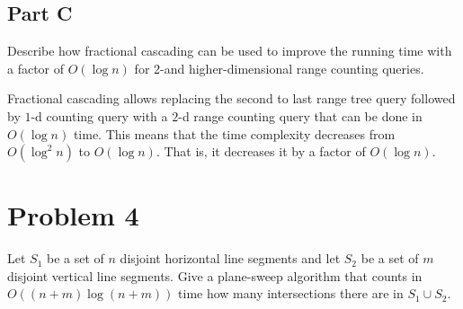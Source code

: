 \documentclass[12pt]{extarticle}
\begin{document}
\subsection*{Part C}
Describe how fractional cascading can be used to improve the running time with a factor of $O(\log n)$ for 2-and higher-dimensional range counting queries.

\begin{solution}
    Fractional cascading allows replacing the second to last range tree query followed by $1$-d counting query with a $2$-d range counting query that can be done in $O(\log n)$ time. This means that the time complexity decreases from $O(\log^2 n)$ to $O(\log n)$. That is, it decreases it by a factor of $O(\log n)$.
\end{solution}

\section*{Problem 4}
Let $S_1$ be a set of $n$ disjoint horizontal line segments and let $S_2$ be a set of $m$ disjoint vertical line segments. Give a plane-sweep algorithm that counts in $O((n+m)\log(n+m))$ time how many intersections there are in $S_1 \cup S_2$.
\end{document}

